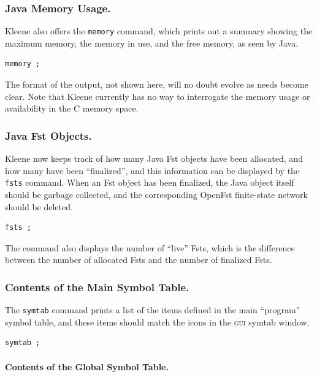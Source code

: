 \documentclass[letterpaper,12pt]{article}
\newcommand{\acro}{\textsc}
\def\CPP{{C\nolinebreak[4]\hspace{-.08em}\raisebox{.3ex}{\footnotesize\bf
+}\nolinebreak\hspace{-.1em}\raisebox{.3ex}{\footnotesize\bf +}}}
\begin{document}
\subsubsection{Java Memory Usage.}

Kleene also offers the \texttt{memory}
command, which prints out a summary showing the maximum memory, the
memory in use, and the free memory, as seen by Java.

\begin{Verbatim}[fontsize=\small]
memory ;
\end{Verbatim}

\noindent
The format of the output, not shown here, will no doubt evolve as needs
become clear.  Note that Kleene currently has no way to interrogate the
memory usage or availability in the \CPP{} memory space.

\subsubsection{Java Fst Objects.}

Kleene now keeps track of how many Java Fst objects have been allocated,
and how many have been ``finalized'', and this information can be
displayed by the \texttt{fsts} command.  When an Fst object has been
finalized, the Java object itself should be garbage collected, and the
corresponding OpenFst finite-state network should be deleted.

\begin{Verbatim}[fontsize=\small]
fsts ;
\end{Verbatim}

\noindent
The command also displays the number of ``live'' Fsts, which is the
difference between the number of allocated Fsts and the number of finalized Fsts.

\subsubsection{Contents of the Main Symbol Table.}

The \texttt{symtab} command prints a list of the items defined in the main
``program'' symbol table, and these items should match the icons in the \acro{gui} symtab
window.

\begin{Verbatim}[fontsize=\small]
symtab ;
\end{Verbatim}

\paragraph{Contents of the Global Symbol Table.}
\end{document}
